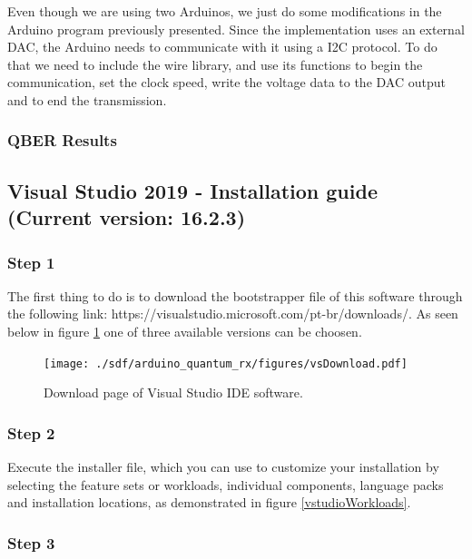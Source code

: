 \begin{refsection}
\begin{figure}[H]
	\end{figure}
	
	Even though we are using two Arduinos, we just do some modifications in the Arduino program previously presented. Since the implementation uses an external DAC, the Arduino needs to communicate with it using a I2C protocol. To do that we need to include the wire library, and use its functions to begin the communication, set the clock speed, write the voltage data to the DAC output and to end the transmission.
	
	\subsubsection{QBER Results }
	

   \clearpage
	
	\subsection{Visual Studio 2019 - Installation guide (Current version: 16.2.3)}
	
	\subsubsection{Step 1}
	
	The first thing to do is to download the bootstrapper file of this software through the following link: https://visualstudio.microsoft.com/pt-br/downloads/. As seen below in figure \ref{vstudio} one of three available versions can be choosen.
	
	\begin{figure}[H]
		\centering
		\texttt{[image: ./sdf/arduino\_quantum\_rx/figures/vsDownload.pdf]}
		\caption{Download page of Visual Studio IDE software.}
		\label{vstudio}
	\end{figure}
	
	
	\subsubsection{Step 2}
	
	Execute the installer file, which you can use to customize your installation by selecting the feature sets or workloads, individual components, language packs and installation locations, as demonstrated in figure \ref{vstudioWorkloads}.
	
	
	
	\subsubsection{Step 3}
	

\end{refsection}
